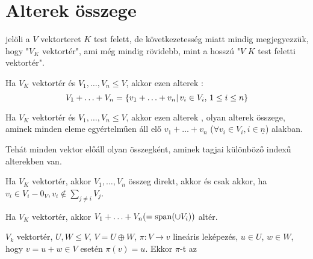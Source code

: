 \section{Alterek összege}
\begin{jel}
	 jelöli a $V$ vektorteret $K$ test felett, de következetesség miatt
	mindig megjegyezzük, hogy "$V_K$ vektortér", ami még mindig rövidebb,
	mint a hosszú "$V$ $K$ test feletti vektortér".
\end{jel}

\begin{ff}
	Ha $V_K$ vektortér és $V_1,\ldots,V_n\leq V$, akkor ezen alterek
	:
	\begin{equation*}
		V_1+\ldots+V_n=\{v_1+\ldots +v_n|\,v_i\in V_i,\,1\leq i\leq n\}
	\end{equation*}
\end{ff}
\begin{ff}
	Ha $V_K$ vektortér és $V_1,\ldots,V_n\leq V$, akkor ezen alterek
	, olyan alterek összege, aminek minden eleme
	egyértelműen áll elő $v_1+\ldots+v_n$ ($\forall v_i\in
	V_i, i\in\underline{n}$) alakban.
\end{ff}
\begin{megj}
	Tehát minden vektor előáll olyan összegként, aminek tagjai különböző
	indexű alterekben van.
\end{megj}
\begin{all}
	Ha $V_K$ vektortér, akkor $V_1,\ldots,V_n$ összeg direkt, akkor és
	csak akkor, ha $v_i\in V_i-{0_V},v_i\not\in\sum_{j\neq i}V_j$.
\end{all}
\begin{all}
	Ha $V_K$ vektortér, akkor $V_1+\ldots +V_n(=\operatorname{span}(\cup V_i))$ altér.
\end{all}
\begin{ff}
	$V_k$ vektortér, $U,W\leq V$, $V=U\oplus W$, $\pi :V\to v$ lineáris
	leképezés, $u\in U$, $w\in W$, hogy $v=u+w \in V$ esetén $\pi(v)=u$.
	Ekkor $\pi$-t az 
\end{ff}


